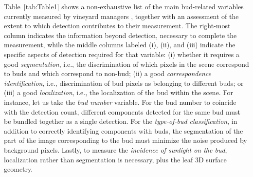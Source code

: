 \documentclass[a4paper,authoryear,review]{elsarticle}
\begin{document}
Table~\ref{tab:Table1} shows a non-exhaustive list of the main bud-related variables currently measured by vineyard managers \citep{sanchez2005bud, noyce2016basis, collins2020effects}, together with an assessment of the extent to which detection contributes to their measurement. The right-most column indicates the information beyond detection, necessary to complete the measurement, while the middle columns labeled (i), (ii), and (iii) indicate the specific aspects of detection required for that variable: (i) whether it requires a good  \emph{segmentation}, i.e., the discrimination of which pixels in the scene correspond to buds and which correspond to non-bud; (ii) a good \emph{correspondence identification}, i.e., discrimination of bud pixels as belonging to different buds; or (iii) a good \emph{localization}, i.e., the localization of the bud within the scene.
%
For instance, let us take the \emph{bud number} variable. For the bud number to coincide with the detection count, different components detected for the same bud must be bundled together as a single detection. For the \emph{type-of-bud classification}, in addition to correctly identifying components with buds, the segmentation of the part of the image corresponding to the bud must minimize the noise produced by background pixels. Lastly, to measure the \emph{incidence of sunlight on the bud}, localization rather than segmentation is necessary, plus the  leaf 3D surface geometry.
\end{document}
